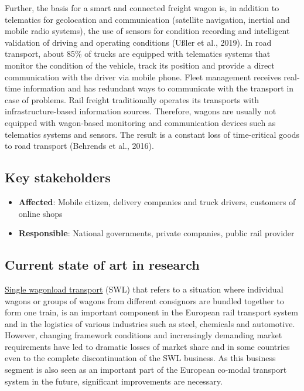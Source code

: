 \documentclass[
]{book}
\providecommand{\tightlist}{%
  \setlength{\itemsep}{0pt}\setlength{\parskip}{0pt}}
\begin{document}
Further, the basis for a smart and connected freight wagon is, in addition to telematics for geolocation and communication (satellite navigation, inertial and mobile radio systems), the use of sensors for condition recording and intelligent validation of driving and operating conditions (Ußler et al., 2019). In road transport, about 85\% of trucks are equipped with telematics systems that monitor the condition of the vehicle, track its position and provide a direct communication with the driver via mobile phone. Fleet management receives real-time information and has redundant ways to communicate with the transport in case of problems. Rail freight traditionally operates its transports with infrastructure-based information sources. Therefore, wagons are usually not equipped with wagon-based monitoring and communication devices such as telematics systems and sensors. The result is a constant loss of time-critical goods to road transport (Behrends et al., 2016).

\hypertarget{key-stakeholders-21}{%
\subsection*{Key stakeholders}\label{key-stakeholders-21}}

\begin{itemize}
\tightlist
\item
  \textbf{Affected}: Mobile citizen, delivery companies and truck drivers, customers of online shops
\item
  \textbf{Responsible}: National governments, private companies, public rail provider
\end{itemize}

\hypertarget{current-state-of-art-in-research-21}{%
\subsection*{Current state of art in research}\label{current-state-of-art-in-research-21}}

\href{https://blog.railcargo.com/de/artikel/einzelwagenverkehr}{Single wagonload transport} (SWL) that refers to a situation where individual wagons or groups of wagons from different consignors are bundled together to form one train, is an important component in the European rail transport system and in the logistics of various industries such as steel, chemicals and automotive. However, changing framework conditions and increasingly demanding market requirements have led to dramatic losses of market share and in some countries even to the complete discontinuation of the SWL business. As this business segment is also seen as an important part of the European co-modal transport system in the future, significant improvements are necessary.
\end{document}
